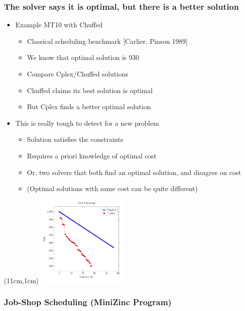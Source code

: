 \documentclass[dvipsnames,aspectratio=169]{beamer}
\begin{document}
\begin{frame}
\frametitle{The solver says it is optimal, but there is a better solution}
\begin{itemize}
\item Example MT10 with Chuffed
\begin{itemize}
 \item Classical scheduling benchmark [Carlier, Pinson 1989]
\item We know that optimal solution is 930
  \item Compare Cplex/Chuffed solutions
  \item Chuffed claims its best solution is optimal
  \item But Cplex finds a better optimal solution
  \end{itemize}
\item This is really tough to detect for a new problem
\begin{itemize}
\item Solution satisfies the constraints
\item Requires a priori knowledge of optimal cost
\item Or, two solvers that both find an optimal solution, and disagree on cost
\item (Optimal solutions with same cost can be quite different)
\end{itemize}
\end{itemize}
\begin{textblock*}{4.5cm}(11cm,1cm)
\includegraphics[width=4.5cm]{images/mt10evolution.PNG}
\end{textblock*}
\end{frame}

\begin{frame}[fragile,label=mt10model]
\frametitle{Job-Shop Scheduling (MiniZinc Program)}

\end{frame}
\end{document}
